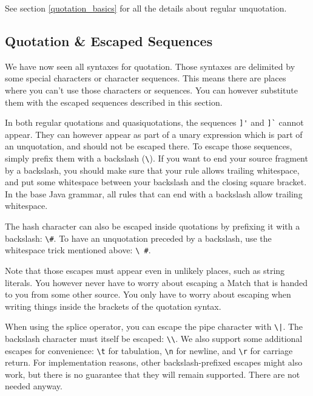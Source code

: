 See section \ref{quotation_basics} for all the details about regular
unquotation.

\subsection{Quotation \& Escaped Sequences}

We have now seen all syntaxes for quotation. Those syntaxes are delimited by
some special characters or character sequences. This means there are places
where you can't use those characters or sequences. You can however substitute
them with the escaped sequences described in this section.

In both regular quotations and quasiquotations, the sequences \lstinline{]'} and
\lstinline{]`} cannot appear. They can however appear as part of a unary
expression which is part of an unquotation, and should not be escaped there. To
escape those sequences, simply prefix them with a backslash (\lstinline{\}). If
  you want to end your source fragment by a backslash, you should make sure that
  your rule allows trailing whitespace, and put some whitespace between your
  backslash and the closing square bracket. In the base Java grammar, all rules
  that can end with a backslash allow trailing whitespace.

  The hash character can also be escaped inside quotations by prefixing it with
  a backslash: \lstinline{\#}. To have an unquotation preceded by a backslash,
  use the whitespace trick mentioned above: \lstinline{\ #}.

  Note that those escapes must appear even in unlikely places, such as string
  literals. You however never have to worry about escaping a Match that is
  handed to you from some other source. You only have to worry about escaping
  when writing things inside the brackets of the quotation syntax.

  When using the splice operator, you can escape the pipe character with
  \lstinline{\|}. The backslash character must itself be escaped:
  \lstinline{\\}. We also support some additional escapes for convenience:
  \lstinline{\t} for tabulation, \lstinline{\n} for newline, and \lstinline{\r}
  for carriage return. For implementation reasons, other backslash-prefixed
  escapes might also work, but there is no guarantee that they will remain
  supported. There are not needed anyway.

